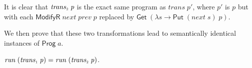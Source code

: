 \documentclass{llncs}
\newcommand{\Conid}[1]{\mathit{#1}}
\newcommand{\Varid}[1]{\mathit{#1}}
\let\Varid\mathit
\let\Conid\mathsf
\begin{document}
It is clear that \ensuremath{\Varid{trans}_{\scaleobj{0.7}{2}}\;\Varid{p}} is the exact same program as \ensuremath{\Varid{trans}\;\Varid{p'}}, where \ensuremath{\Varid{p'}}
is \ensuremath{\Varid{p}} but with each \ensuremath{\Conid{ModifyR}\;\Varid{next}\;\Varid{prev}\;\Varid{p}} replaced by \ensuremath{\Conid{Get}\;(\lambda \Varid{s}\to \Conid{Put}\;(\Varid{next}\;\Varid{s})\;\Varid{p})}.

We then prove that these two transformations lead to semantically identical
instances of \ensuremath{\Conid{Prog}\;\Varid{a}}.
\begin{lemma}
  \ensuremath{\Varid{run}\;(\Varid{trans}_{\scaleobj{0.7}{1}}\;\Varid{p})\mathrel{=}\Varid{run}\;(\Varid{trans}_{\scaleobj{0.7}{2}}\;\Varid{p})}. \checkmark
\end{lemma}

\end{document}
